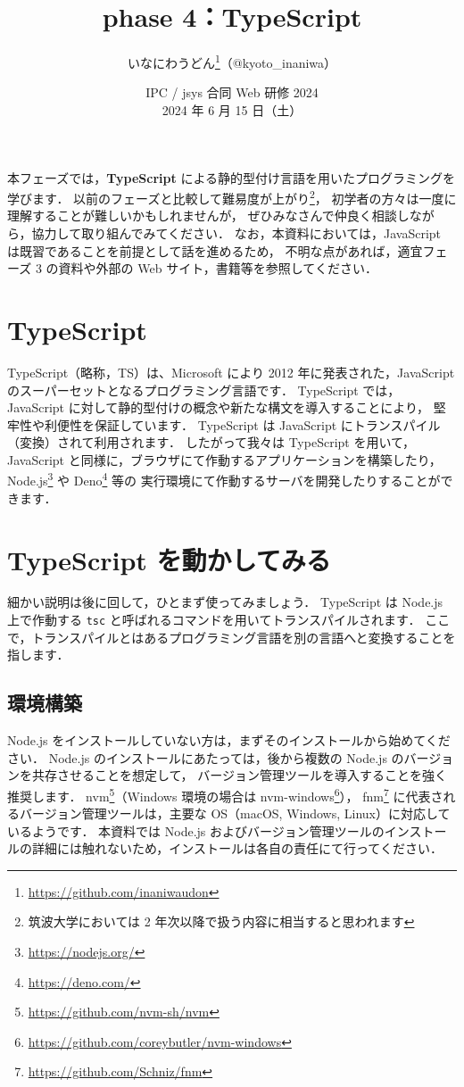 \documentclass[a4j, 11pt]{jarticle}
\title{phase 4：TypeScript}
\author{いなにわうどん\footnote{\url{https://github.com/inaniwaudon}}（@kyoto\_inaniwa）}
\date{IPC / jsys 合同 Web 研修 2024\\2024 年 6 月 15 日（土）}
\begin{document}
\maketitle

本フェーズでは，\textbf{TypeScript} による静的型付け言語を用いたプログラミングを学びます．
以前のフェーズと比較して難易度が上がり\footnote{筑波大学においては 2 年次以降で扱う内容に相当すると思われます}，
初学者の方々は一度に理解することが難しいかもしれませんが，
ぜひみなさんで仲良く相談しながら，協力して取り組んでみてください．
なお，本資料においては，JavaScript は既習であることを前提として話を進めるため，
不明な点があれば，適宜フェーズ 3 の資料や外部の Web サイト，書籍等を参照してください．

\section{TypeScript}

TypeScript（略称，TS）は、Microsoft により 2012 年に発表された，JavaScript のスーパーセットとなるプログラミング言語です．
TypeScript では，JavaScript に対して静的型付けの概念や新たな構文を導入することにより，
堅牢性や利便性を保証しています．
TypeScript は JavaScript にトランスパイル（変換）されて利用されます．
したがって我々は TypeScript を用いて，JavaScript と同様に，ブラウザにて作動するアプリケーションを構築したり，
Node.js\footnote{\url{https://nodejs.org/}} や Deno\footnote{\url{https://deno.com/}} 等の
実行環境にて作動するサーバを開発したりすることができます．

\section{TypeScript を動かしてみる}

細かい説明は後に回して，ひとまず使ってみましょう．
TypeScript は Node.js 上で作動する \verb|tsc| と呼ばれるコマンドを用いてトランスパイルされます．
ここで，トランスパイルとはあるプログラミング言語を別の言語へと変換することを指します．

\subsection{環境構築}

Node.js をインストールしていない方は，まずそのインストールから始めてください．
Node.js のインストールにあたっては，後から複数の Node.js のバージョンを共存させることを想定して，
バージョン管理ツールを導入することを強く推奨します．
nvm\footnote{\url{https://github.com/nvm-sh/nvm}}（Windows 環境の場合は nvm-windows\footnote{\url{https://github.com/coreybutler/nvm-windows}}），
fnm\footnote{\url{https://github.com/Schniz/fnm}} に代表されるバージョン管理ツールは，主要な OS（macOS, Windows, Linux）に対応しているようです．
本資料では Node.js およびバージョン管理ツールのインストールの詳細には触れないため，インストールは各自の責任にて行ってください．
\end{document}
